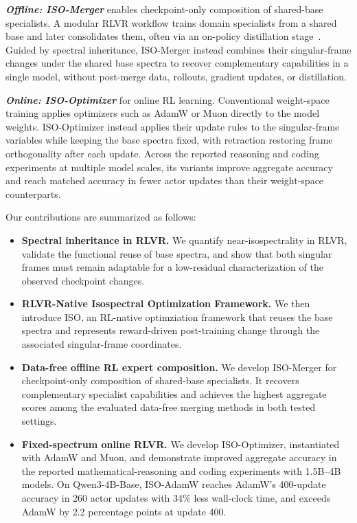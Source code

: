 \documentclass[11pt, a4paper]{utda}
\theoremstyle{plain}
\theoremstyle{definition}
\theoremstyle{remark}
\newenvironment{isoblock}[1][1.0em]{%
  \begin{list}{}{%
    \setlength{\leftmargin}{#1}%
    \setlength{\rightmargin}{0pt}%
    \setlength{\topsep}{0.25em}%
    \setlength{\partopsep}{0pt}%
    \setlength{\parsep}{0.15em}%
    \setlength{\itemsep}{0pt}%
  }%
  \item[]\ignorespaces
}{%
  \end{list}
}
\begin{document}
\begin{isoblock}[0.5em]
\textbf{\textit{Offline: ISO-Merger}} enables checkpoint-only composition of shared-base specialists.
A modular RLVR workflow trains domain specialists from a shared base and later
consolidates them, often via an on-policy distillation
stage~\cite{zeng2026glm}.
Guided by spectral inheritance, ISO-Merger instead combines their singular-frame changes under
the shared base spectra to recover complementary capabilities
in a single model, without post-merge data, rollouts, gradient
updates, or distillation.

\textbf{\textit{Online: ISO-Optimizer}} for online RL learning.
Conventional weight-space training applies optimizers such as AdamW
or Muon directly to the model weights.
ISO-Optimizer instead applies their update rules to the singular-frame
variables while keeping the base spectra fixed, with retraction
restoring frame orthogonality after each update.
Across the reported reasoning and coding experiments at multiple
model scales, its variants improve aggregate accuracy and reach
matched accuracy in fewer actor updates than their weight-space
counterparts.
\end{isoblock}

Our contributions are summarized as follows:
\begin{itemize}[
    itemsep=0pt,   %
    topsep=-2pt,    %
    parsep=0pt,    %
    partopsep=0pt,  %
    leftmargin=*,
]
    \item \textbf{Spectral inheritance in RLVR.}
    We quantify near-isospectrality in RLVR, validate the functional
    reuse of base spectra, and show that both singular frames must remain adaptable for a low-residual characterization of the observed checkpoint changes.

    \item \textbf{RLVR-Native Isospectral Optimization Framework.}
    We then introduce ISO, an RL-native optimziation framework that reuses the base spectra
    and represents reward-driven post-training change through the associated
    singular-frame coordinates.

    \item \textbf{Data-free offline RL expert composition.}
     We develop ISO-Merger for checkpoint-only composition of
    shared-base specialists.
    It recovers complementary specialist capabilities and achieves
    the highest aggregate scores among the evaluated data-free
    merging methods in both tested settings.

    \item \textbf{Fixed-spectrum online RLVR.}
    We develop ISO-Optimizer, instantiated with AdamW and Muon,
    and demonstrate improved aggregate accuracy in the reported
    mathematical-reasoning and coding experiments with
    1.5B--4B models.
    On Qwen3-4B-Base, ISO-AdamW reaches AdamW's 400-update
    accuracy in 260 actor updates with 34\% less wall-clock time,
    and exceeds AdamW by 2.2 percentage points at update 400.
\end{itemize}
\end{document}
